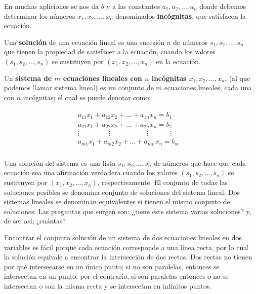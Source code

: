 \documentclass{article}
\begin{document}
En muchas apliciones se nos da $b$ y a las constantes $ a_1,a_2,\dots, a_n $ donde debemos determinar los números $ x_1,x_2,\dots, x_n $ denominados \textbf{incógnitas}, que satisfacen la ecuación.

Una \textbf{solución} de una ecuación lineal es una sucesión $ n $ de números $ s_1,s_2,\dots, s_n $ que tienen la propiedad de satisfacer a la ecuación, cuando los valores $(s_1, s_2, \dots, s_n)$ se sustituyen por $(x_1, x_2, \dots, x_n)$ en la ecuación.

Un \textbf{sistema de $m$ ecuaciones lineales con $n$ incógnitas $ x_1,x_2,\dots, x_n $}, (al que podemos llamar sistema lineal) es un conjunto de $m$ ecuaciones lineales, cada una con $ n $ incógnitas; el cual se puede denotar como:

\begin{equation}
    \begin{matrix}
        \begin{aligned}
            a_{11}x_1 + a_{12}x_2 + \dots + a_{1n}x_n = b_1\\
            a_{21}x_1 + a_{22}x_2 + \dots + a_{2n}x_n = b_2\\
            \vdots \phantom{aaaaaaaa} \vdots \phantom{aaaaaaaaaa} \vdots \phantom{aaaaaa} \vdots\\
            a_{m1}x_1 + a_{m2}x_2 + \dots + a_{mn}x_n = b_m\\
        \end{aligned}
    \end{matrix}
\end{equation}

\pagebreak

Una solución del sistema es una lista $s_1, s_2, \dots, s_n$ de números que hace que cada ecuación sea una afirmación verdadera cuando los valores $(s_1, s_2, \dots, s_n)$ se sustituyen por $(x_1, x_2, \dots, x_n)$, respectivamente. El conjunto de todas las soluciones posibles se denomina conjunto de soluciones del sistema lineal. Dos sistemas lineales se denominan equivalentes si tienen el mismo conjunto de soluciones. Las preguntas que surgen son: ¿tiene este sistema varias soluciones? y, de ser así, ¿cuántas? 

Encontrar el conjunto solución de un sistema de dos ecuaciones lineales en dos variables es fácil porque cada ecuación corresponde a una línea recta, por lo cual la solución equivale a encontrar la intersección de dos rectas. Dos rectas no tienen por qué intersecarse en un único punto; si no son paralelas, entonces se intersectan en un punto, por el contrario, si son paralelas entonces o no se intersectan o son la misma recta y se intersectan en infinitos puntos.
\end{document}
